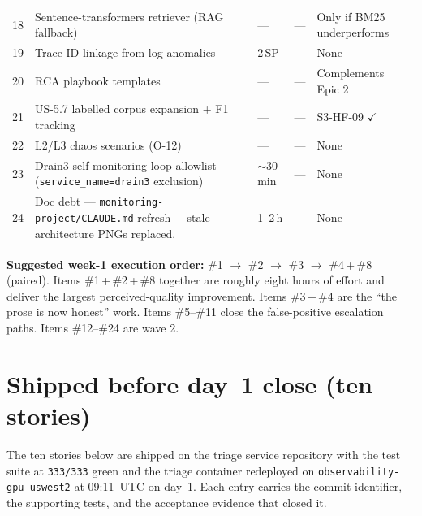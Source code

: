 \documentclass[11pt,a4paper,oneside]{report}
\begin{document}
\begin{longtable}{rp{} p{} p{} p{}}
18 & Sentence-transformers retriever (RAG fallback) & ---
                                              & ---
                                              & Only if BM25 underperforms \\
19 & Trace-ID linkage from log anomalies     & 2\,SP
                                              & ---
                                              & None \\
20 & RCA playbook templates                   & ---
                                              & ---
                                              & Complements Epic 2 \\
21 & US-5.7 labelled corpus expansion + F1 tracking
                                              & ---
                                              & ---
                                              & S3-HF-09 $\checkmark$ \\
22 & L2/L3 chaos scenarios (O-12)             & ---
                                              & ---
                                              & None \\
23 & Drain3 self-monitoring loop allowlist
     (\texttt{service\_name=drain3} exclusion)
                                              & $\sim$30\,min
                                              & ---
                                              & None \\
24 & Doc debt --- \texttt{monitoring-project/CLAUDE.md} refresh
     + stale architecture PNGs replaced.
                                              & 1--2\,h
                                              & ---
                                              & None \\
\end{longtable}

\noindent
\textbf{Suggested week-1 execution order:}
\#1 $\to$ \#2 $\to$ \#3 $\to$ \#4\,+\,\#8 (paired).  Items
\#1\,+\,\#2\,+\,\#8 together are roughly eight hours of effort and
deliver the largest perceived-quality improvement.  Items \#3\,+\,\#4
are the ``the prose is now honest'' work.  Items \#5--\#11 close the
false-positive escalation paths.  Items \#12--\#24 are wave 2.

\section{Shipped before day~1 close (ten stories)}

The ten stories below are shipped on the triage service repository
with the test suite at \texttt{333/333} green and the triage
container redeployed on \texttt{observability-gpu-uswest2} at
09:11~UTC on day~1.  Each entry carries the commit identifier,
the supporting tests, and the acceptance evidence that closed it.
\end{document}
